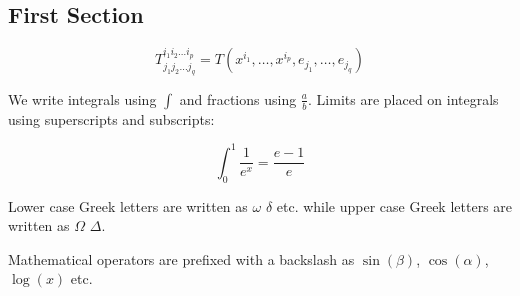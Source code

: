 \documentclass[12pt, a4paper]{article}
\begin{document}
\subsection{First Section}

$$T^{i_1 i_2 \dots i_p}_{j_1 j_2 \dots j_q} = T(x^{i_1},\dots,x^{i_p},e_{j_1},\dots,e_{j_q})$$
 
We write integrals using $\int$ and fractions using $\frac{a}{b}$. Limits are placed on integrals using superscripts and subscripts:
 
$$\int_0^1 \frac{1}{e^x} =  \frac{e-1}{e}$$
 
Lower case Greek letters are written as $\omega$ $\delta$ etc. while upper case Greek letters are written as $\Omega$ $\Delta$.
 
Mathematical operators are prefixed with a backslash as $\sin(\beta)$, $\cos(\alpha)$, $\log(x)$ etc.
\end{document}
